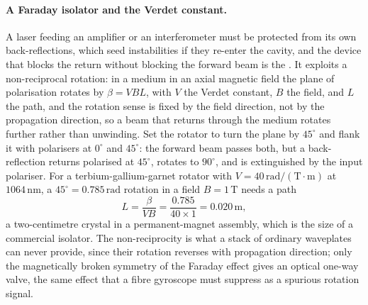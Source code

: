 \paragraph{A Faraday isolator and the Verdet constant.} A laser feeding an
amplifier or an interferometer must be protected from its own back-reflections,
which seed instabilities if they re-enter the cavity, and the device that blocks
the return without blocking the forward beam is the . It
exploits a non-reciprocal rotation: in a medium in an axial magnetic field the
plane of polarisation rotates by $\beta = V B L$, with $V$ the Verdet constant, $B$
the field, and $L$ the path, and the rotation sense is fixed by the field
direction, not by the propagation direction, so a beam that returns through the
medium rotates further rather than unwinding. Set the rotator to turn the plane by
$45^{\circ}$ and flank it with polarisers at $0^{\circ}$ and $45^{\circ}$: the
forward beam passes both, but a back-reflection returns polarised at $45^{\circ}$,
rotates to $90^{\circ}$, and is extinguished by the input polariser. For a
terbium-gallium-garnet rotator with $V = 40\,\si{\radian}/(\si{\tesla}\cdot\si{
\meter})$ at $1064\,\si{\nano\meter}$, a $45^{\circ} = 0.785\,\si{\radian}$
rotation in a field $B = 1\,\si{\tesla}$ needs a path
\[
L = \frac{\beta}{V B} = \frac{0.785}{40\times 1} = 0.020\,\si{\meter},
\]
a two-centimetre crystal in a permanent-magnet assembly, which is the size of a
commercial isolator. The non-reciprocity is what a stack of ordinary waveplates
can never provide, since their rotation reverses with propagation direction; only
the magnetically broken symmetry of the Faraday effect gives an optical one-way
valve, the same effect that a fibre gyroscope must suppress as a spurious rotation
signal.

